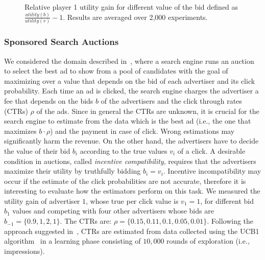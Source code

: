 \begin{figure}[t]
    \begin{minipage}{\columnwidth}
    \centering 
    \setlength{}
    \setlength{}
    
    \caption{Relative player 1 utility gain for different value of the bid defined as $\frac{utility(b)}{utility(v)} - 1$. Results are averaged over 2,000 experiments.}\label{F:spSearch}
    \end{minipage}
\end{figure}

\subsubsection{Sponsored Search Auctions}
We considered the domain described in~\cite{xu2013mab}, where a search engine runs an auction to select the best ad to show from a pool of candidates with the goal of maximizing over a value that depends on the bid of each advertiser and its click probability. 
Each time an ad is clicked, the search engine charges the advertiser a fee that depends on the bids $b$ of the advertisers and the click through rates (CTRs) $\rho$ of the ads. 
Since in general the CTRs are unknown, it is crucial for the search engine to estimate from the data which is the best ad (i.e., the one that maximizes $b\cdot\rho$) and the payment in case of click. 
Wrong estimations may significantly harm the revenue.
On the other hand, the advertisers have to decide the value of their bid $b_i$ according to the true values $v_i$ of a click. A desirable condition in auctions, called \textit{incentive compatibility}, requires that the advertisers maximize their utility by truthfully bidding $b_i = v_i$. Incentive incompatibility may occur if the estimate of the click probabilities are not accurate, therefore it is interesting to evaluate how the estimators perform on this task.
We measured the utility gain of advertiser $1$, whose true per click value is $v_1 = 1$, for different bid $b_1$ values and competing with four other advertisers whose bids are $b_{-1} = \lbrace 0.9, 1, 2, 1 \rbrace$. The CTRs are: $\rho = \lbrace 0.15, 0.11, 0.1, 0.05, 0.01 \rbrace$. 
Following the approach suggested in~\cite{xu2013mab}, CTRs are estimated from data collected using the UCB1 algorithm~\cite{auer2002finite} in a learning phase consisting of $10,000$ rounds of exploration (i.e., impressions).

